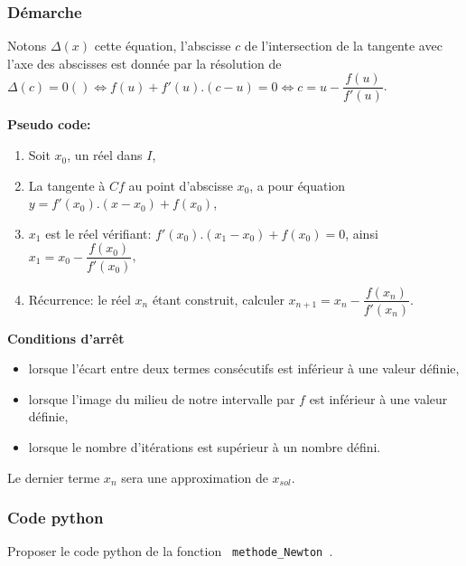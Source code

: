 \begin{frame}[fragile]
\frametitle{Démarche}

Notons $\Delta(x)$ cette équation, l'abscisse $c$ de l'intersection de la tangente avec l'axe des abscisses est donnée par la résolution de
$\Delta(c)=0() \Leftrightarrow f(u)+f'(u).(c-u) = 0 \Leftrightarrow c=u-\dfrac{f(u)}{f'(u)}$.

\textbf{Pseudo code:}
\begin{enumerate}
 \item Soit $x_0$, un réel dans $I$,
 \item La tangente à $Cf$ au point d'abscisse $x_0$, a pour équation $y=f'(x_0).(x-x_0)+f(x_0)$,
 \item $x_1$ est le réel vérifiant: $f'(x_0).(x_1-x_0)+f(x_0)=0$,
ainsi $x_1=x_0-\dfrac{f(x_0)}{f'(x_0)}$,
 \item Récurrence: le réel $x_n$ étant construit, calculer $x_{n+1}=x_n-\dfrac{f(x_n)}{f'(x_n)}$.
\end{enumerate}

\textbf{Conditions d'arrêt}
\begin{itemize}
 \item lorsque l'écart entre deux termes consécutifs est inférieur à une valeur définie,
 \item lorsque l'image du milieu de notre intervalle par $f$ est inférieur à une valeur définie,
 \item lorsque le nombre d'itérations est supérieur à un nombre défini.
\end{itemize}

Le dernier terme $x_n$ sera une approximation de $x_{sol}$.

\end{frame}
\begin{frame}[fragile]
\frametitle{Code python}

Proposer le code python de la fonction \verb? methode_Newton ?.
\begin{GrayBox}[0.85\textwidth]
\begin{semiverbatim}\small
{}
   \end{semiverbatim}
\end{GrayBox}
\end{frame}

